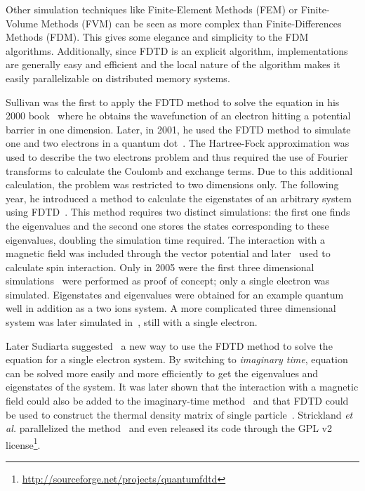 Other simulation techniques like Finite-Element Methods (FEM) or Finite-Volume
Methods (FVM) can be seen as more complex than Finite-Differences Methods
(FDM). This gives some elegance and simplicity to the FDM algorithms.
Additionally, since FDTD is an explicit algorithm, implementations are
generally easy and efficient and the local nature of the algorithm makes it
easily parallelizable on distributed memory systems.

Sullivan was the first to apply the FDTD method to solve the \schrodinger
equation in his 2000 book~\cite{Sullivan2000} where he obtains the wavefunction
of an electron hitting a potential barrier in one dimension.
Later, in 2001, he used the FDTD
method to simulate one and two electrons in a quantum dot~\cite{Sullivan2001}.
The Hartree-Fock approximation was used to describe the two electrons problem
and thus required the use of Fourier transforms to calculate the Coulomb
and exchange terms. Due to this additional calculation, the problem was
restricted to two dimensions only. The following year, he introduced a method
to calculate the eigenstates of an arbitrary system using
FDTD~\cite{Sullivan2002}. This method requires two distinct simulations: the
first one finds the eigenvalues and the second one stores the states
corresponding to these eigenvalues, doubling the simulation time required.
The interaction with a magnetic field was included through the vector potential
and later~\cite{Sullivan2003,Sullivan2004} used to calculate spin interaction.
Only in 2005 were the first three dimensional
simulations~\cite{Sullivan2005a} were performed as proof of concept; only a
single electron was simulated. Eigenstates and eigenvalues were obtained for an
example quantum well in addition as a two ions system. A more complicated three
dimensional system was later simulated in~\cite{Sullivan2005b}, still with a
single electron.

Later Sudiarta suggested~\cite{Sudiarta2007} a new way to use the FDTD method to
solve the \schrodinger equation for a single electron system. By switching to
\textit{imaginary time}, \schrodinger equation can be solved more easily and
more efficiently to get the eigenvalues and eigenstates of the system. It was
later shown that the interaction with a magnetic field could also be added to
the imaginary-time method~\cite{Sudiarta2008} and that FDTD could be used to
construct the thermal density matrix of single particle~\cite{Sudiarta2009}.
Strickland \textit{et al.} parallelized the method~\cite{Strickland2010} and
even released its code through the GPL v2
license\footnote{\url{http://sourceforge.net/projects/quantumfdtd}}.


